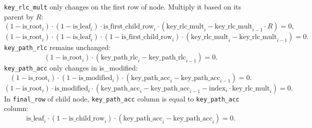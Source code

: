 \verb|key_rlc_mult| only changes on the first row of node. Multiply it based on its parent by $R$:
\[ (1 - \mathrm{is\_root}_i) \cdot (1 - \mathrm{is\_leaf}_i) \cdot \mathrm{is\_first\_child\_row}_i \cdot (\mathrm{key\_rlc\_mult}_i - \mathrm{key\_rlc\_mult}_{i-1} \cdot R) = 0, \]
\[ (1 - \mathrm{is\_root}_i) \cdot (1 - \mathrm{is\_leaf}_i) \cdot (1-\mathrm{is\_first\_child\_row}_i) \cdot (\mathrm{key\_rlc\_mult}_i - \mathrm{key\_rlc\_mult}_{i-1}) =0. \]
\verb|key_path_rlc| remains unchanged:
\[ (1 - \mathrm{is\_root}_i) \cdot (\mathrm{key\_path\_rlc}_i - \mathrm{key\_path\_rlc}_{i-1}) =0. \]
\verb|key_path_acc| only changes in is\_modified:
\[ (1 - \mathrm{is\_root}_i) \cdot (1 - \mathrm{is\_modified}_i) \cdot (\mathrm{key\_path\_acc}_i - \mathrm{key\_path\_acc}_{i-1}) = 0. \]
\[ (1 - \mathrm{is\_root}_i) \cdot \mathrm{is\_modified}_i \cdot (\mathrm{key\_path\_acc}_i - \mathrm{key\_path\_acc}_{i-1} - \mathrm{index}_i \cdot \mathrm{key\_rlc\_mult}_i) = 0. \]
In \verb|final_row| of child node, \verb|key_path_acc| column is equal to \verb|key_path_acc| column:
\[ \mathrm{is\_leaf}_i \cdot (1 - \mathrm{is\_child\_row}_i) \cdot (\mathrm{key\_path\_acc}_i - \mathrm{key\_path\_acc}_i) = 0. \]
